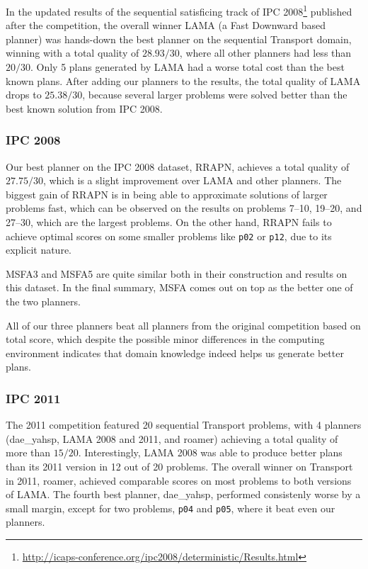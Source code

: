 In the updated results of the sequential satisficing track of IPC 2008\footnote{\url{http://icaps-conference.org/ipc2008/deterministic/Results.html}} published after the competition,
the overall winner LAMA (a Fast Downward based planner)
was hands-down the best planner on the sequential Transport domain, winning
with a total quality of $28.93/30$, where all other planners had less than $20/30$.
Only 5 plans generated by LAMA had a worse total cost than the best known plans. After adding our planners to the results,
the total quality of LAMA drops to $25.38/30$,
because several larger problems were solved better than the
best known solution from IPC 2008.

\subsubsection{IPC 2008}

Our best planner  on the IPC 2008 dataset, RRAPN, achieves a total quality of $27.75/30$,
which is a slight improvement over LAMA and other planners. The biggest gain of RRAPN is in being able to approximate
solutions of larger problems fast, which can be observed on
the results on problems 7--10, 19--20, and 27--30,
which are the largest problems.
On the other hand, RRAPN fails to achieve optimal scores
on some smaller problems like \verb+p02+ or \verb+p12+,
due to its explicit nature.

MSFA3 and MSFA5 are quite similar both in their construction and results on this dataset.
In the final summary, MSFA comes out on top as the better one of the two planners.

All of our three planners beat all planners from the original competition based on total score,
which despite the possible minor differences in the computing environment indicates that
domain knowledge indeed helps us generate better plans.

\subsubsection{IPC 2011}

The 2011 competition featured 20 sequential Transport problems,
with 4 planners (dae\_yahsp, LAMA 2008 and 2011, and roamer) achieving a total quality of more than $15/20$.
Interestingly, LAMA 2008 was able to produce better plans than its 2011 version in 12 out of 20 problems. The overall winner on Transport in 2011, roamer, achieved comparable scores on most problems to both versions of LAMA. The fourth best planner, dae\_yahsp, performed consistenly worse by a small margin, except for two problems, \verb+p04+ and \verb+p05+, where it beat even our planners.

